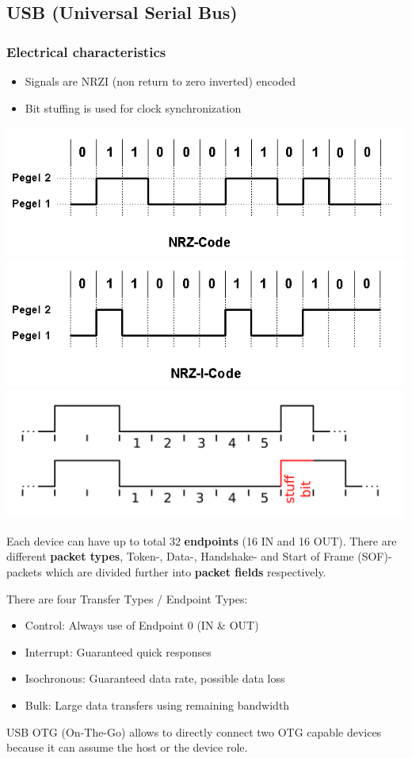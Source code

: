 \subsection{USB (Universal Serial Bus) }
\subsubsection{Electrical characteristics}
\begin{itemize}
	\itemsep-.5em 
	\item Signals are NRZI (non return to zero inverted) encoded
	\item Bit stuffing is used for clock synchronization
\end{itemize}
\begin{center}
	\includegraphics[width=.6\columnwidth]{"Images/NRZ_code.png"}
	\includegraphics[width=.6\columnwidth]{"Images/NRZI_code.png"}
	\includegraphics[width=.8\columnwidth]{"Images/BitStuffing.png"}
\end{center}

Each device can have up to total 32 \textbf{endpoints} (16 IN and 16 OUT).
There are different \textbf{packet types}, Token-, Data-, Handshake- and Start of Frame (SOF)- packets which are divided further into \textbf{packet fields} respectively.

There are four Transfer Types / Endpoint Types:
\begin{itemize}
	\itemsep-.5em
	\item Control: Always use of Endpoint 0 (IN \& OUT)
	\item Interrupt: Guaranteed quick responses
	\item Isochronous: Guaranteed data rate, possible data loss
	\item Bulk: Large data transfers using remaining bandwidth
\end{itemize}

USB OTG (On-The-Go) allows to directly connect two OTG capable devices because it can assume the host or the device role.

